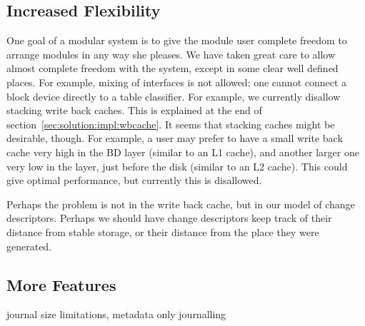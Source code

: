 \subsection{Increased Flexibility}


One goal of a modular system is to give the module user complete freedom to
arrange modules in any way she pleases. We have taken great care to allow
almost complete freedom with the system, except in some clear well defined
places. For example, mixing of interfaces is not allowed; one cannot
connect a block device directly to a table classifier. For example, we
currently disallow stacking write back caches. This is explained at the end
of section~\ref{sec:solution:impl:wbcache}. It seems that stacking caches
might be desirable, though. For example, a user may prefer to have a small
write back cache very high in the BD layer (similar to an L1 cache), and
another larger one very low in the layer, just before the disk (similar to
an L2 cache). This could give optimal performance, but currently this is
disallowed.

Perhaps the problem is not in the write back cache, but in our model of change
descriptors. Perhaps we should have change descriptors keep track of their
distance from stable storage, or their distance from the place they were
generated.

\subsection{More Features}
journal size limitations, metadata only journalling
